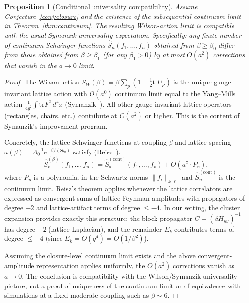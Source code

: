 \documentclass[11pt]{article}
\newtheorem{proposition}[theorem]{Proposition}
\theoremstyle{definition}
\newcommand{\tr}{\mathrm{tr}}
\begin{document}
\begin{proposition}[Conditional universality compatibility]%
\label{prop:universality}
Assume Conjecture~\ref{conj:closure} and the existence of the
subsequential continuum limit in Theorem~\ref{thm:continuum}.  The
resulting Wilson-action limit is compatible with the usual Symanzik
universality expectation.  Specifically:
any finite number of continuum Schwinger functions
$\hat S_n(f_1,\ldots,f_n)$ obtained from $\beta\ge\beta_0$
differ from those obtained from $\beta\ge\beta_1$ \textup{(}for
any $\beta_1>0$\textup{)} by at most $O(a^2)$ corrections
that vanish in the $a\to 0$ limit.
\end{proposition}

\begin{proof}
The Wilson action $S_W(\beta)=\beta\sum_p(1-\frac{1}{2}\tr U_p)$
is the unique gauge-invariant lattice action with
$O(a^0)$ continuum limit equal to the Yang--Mills action
$\frac{1}{4g^2}\int\tr F^2\,d^4x$
(Symanzik~\cite{Symanzik75}).  All other gauge-invariant
lattice operators (rectangles, chairs, etc.)\ contribute at
$O(a^2)$ or higher.  This is the content of Symanzik's
improvement program.

Concretely, the lattice Schwinger functions at coupling $\beta$
and lattice spacing $a(\beta)=\Lambda_0^{-1}e^{-\beta/(8b_0)}$
satisfy (Reisz~\cite{Reisz1988,Reisz89}):
\begin{equation}
\hat S_n^{(\beta)}(f_1,\ldots,f_n)
=\hat S_n^{(\mathrm{cont})}(f_1,\ldots,f_n)
+O(a^2\cdot P_n),
\end{equation}
where $P_n$ is a polynomial in the Schwartz norms $\|f_i\|_{k,\ell}$
and $\hat S_n^{(\mathrm{cont})}$ is the continuum limit.
Reisz's theorem applies whenever the lattice correlators are
expressed as convergent sums of lattice Feynman amplitudes with
propagators of degree $-2$ and lattice-artifact terms of
degree $\le -4$.  In our setting, the cluster expansion
provides exactly this structure: the block propagator
$C=(\beta H_{yy})^{-1}$ has degree $-2$ (lattice Laplacian),
and the remainder $E_k$ contributes terms of degree $\le -4$
(since $E_k=O(g^4)=O(1/\beta^2)$).

Assuming the closure-level continuum limit exists and the above convergent-amplitude representation applies uniformly, the $O(a^2)$ corrections vanish as $a\to0$.  The conclusion is compatibility with the Wilson/Symanzik universality picture, not a proof of uniqueness of the continuum limit or of equivalence with simulations at a fixed moderate coupling such as $\beta\sim6$.
\end{proof}
\end{document}
